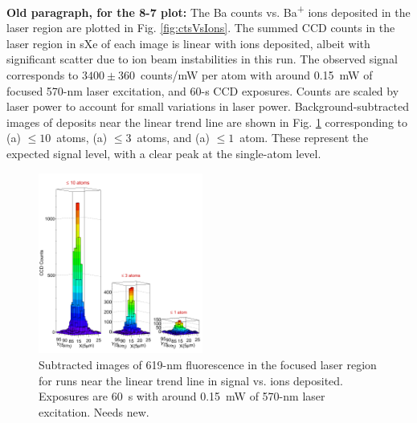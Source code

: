 \documentclass[aps,pra,reprint,superscriptaddress]{revtex4-1}
\begin{document}
{\color{gray}\textbf{Old paragraph, for the 8-7 plot:}  The Ba counts vs. Ba\textsuperscript{+} ions deposited in the laser region are plotted in Fig. \ref{fig:ctsVsIons}.  The summed CCD counts in the laser region in sXe of each image is linear with ions deposited{\color{gray}, albeit with significant scatter due to ion beam instabilities in this run}.  The observed signal corresponds to $3400 \pm 360$~counts/mW per atom with around {\color{gray}0.15~mW} of focused 570-nm laser excitation, and 60-s CCD exposures.  Counts are scaled by laser power to account for small variations in laser power.  Background-subtracted images of deposits near the linear trend line are shown in Fig. \ref{fig:train} corresponding to (a) $\leq 10$~atoms, (a) $\leq 3$~atoms, and (a) $\leq 1$~atom.  These represent the expected signal level, with a clear peak at the single-atom level.}



\begin{figure}
\includegraphics[width=0.48\textwidth]{figures/lego_train_fromthesis.png}
\caption{Subtracted images of 619-nm fluorescence in the focused laser region for runs near the linear trend line in signal vs. ions deposited.  Exposures are 60~s with around 0.15~mW of 570-nm laser excitation. {\color{gray}Needs new.}}
\label{fig:train}
\end{figure}
\end{document}
